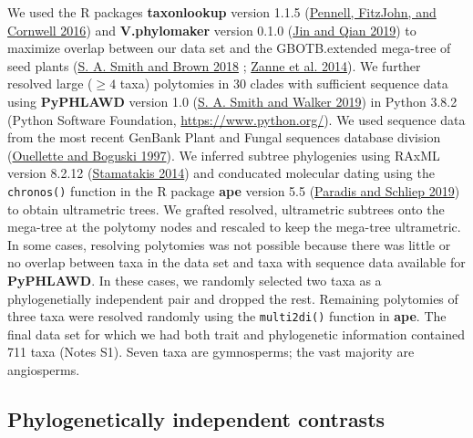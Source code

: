 \documentclass[
  10pt,
]{article}
\begin{document}
We used the R packages \textbf{taxonlookup} version 1.1.5 (\protect\hyperlink{ref-pennell_simple_2016}{Pennell, FitzJohn, and Cornwell 2016}) and \textbf{V.phylomaker} version 0.1.0 (\protect\hyperlink{ref-jin_vphylomaker_2019}{Jin and Qian 2019}) to maximize overlap between our data set and the GBOTB.extended mega-tree of seed plants (\protect\hyperlink{ref-smith_constructing_2018}{S. A. Smith and Brown 2018} ; \protect\hyperlink{ref-zanne_three_2014}{Zanne et al. 2014}). We further resolved large (\(\ge4\) taxa) polytomies in 30 clades with sufficient sequence data using \textbf{PyPHLAWD} version 1.0 (\protect\hyperlink{ref-smith_pyphlawd_2019}{S. A. Smith and Walker 2019}) in Python 3.8.2 (Python Software Foundation, \url{https://www.python.org/}). We used sequence data from the most recent GenBank Plant and Fungal sequences database division (\protect\hyperlink{ref-ouellette_database_1997}{Ouellette and Boguski 1997}). We inferred subtree phylogenies using RAxML version 8.2.12 (\protect\hyperlink{ref-stamatakis_raxml_2014}{Stamatakis 2014}) and conducated molecular dating using the \texttt{chronos()} function in the R package \textbf{ape} version 5.5 (\protect\hyperlink{ref-paradis_ape_2019}{Paradis and Schliep 2019}) to obtain ultrametric trees. We grafted resolved, ultrametric subtrees onto the mega-tree at the polytomy nodes and rescaled to keep the mega-tree ultrametric. In some cases, resolving polytomies was not possible because there was little or no overlap between taxa in the data set and taxa with sequence data available for \textbf{PyPHLAWD}. In these cases, we randomly selected two taxa as a phylogenetially independent pair and dropped the rest. Remaining polytomies of three taxa were resolved randomly using the \texttt{multi2di()} function in \textbf{ape}. The final data set for which we had both trait and phylogenetic information contained 711 taxa (Notes S1). Seven taxa are gymnosperms; the vast majority are angiosperms.

\hypertarget{phylogenetically-independent-contrasts}{%
\subsection{Phylogenetically independent contrasts}\label{phylogenetically-independent-contrasts}}
\end{document}
